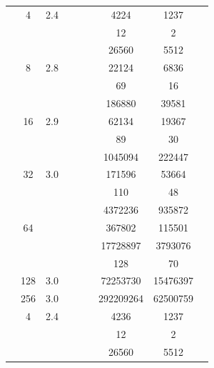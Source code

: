 \begin{table}[htbp]
\begin{tabular}{l S[table-format=3.0] S[table-format=4.1] l S[table-format=6.0] S[table-format=6.0] S[table-format=6.0] S[table-format=5.0] S[table-format=2.0]}
    \midrule
     & 4 & 2.4 &  & {\text{---}} & {\text{---}} & 4224 & 1237 & {\text{---}} \\
     &  &  &  & {\text{---}} & {\text{---}} & 12 & 2 & {\text{---}} \\
     &  &  &  & {\text{---}} & {\text{---}} & 26560 & 5512 & {\text{---}} \\
     & 8 & 2.8 &  & {\text{---}} & {\text{---}} & 22124 & 6836 & {\text{---}} \\
     &  &  &  & {\text{---}} & {\text{---}} & 69 & 16 & {\text{---}} \\
     &  &  &  & {\text{---}} & {\text{---}} & 186880 & 39581 & {\text{---}} \\
     & 16 & 2.9 &  & {\text{---}} & {\text{---}} & 62134 & 19367 & {\text{---}} \\
     &  &  &  & {\text{---}} & {\text{---}} & 89 & 30 & {\text{---}} \\
     &  &  &  & {\text{---}} & {\text{---}} & 1045094 & 222447 & {\text{---}} \\
     & 32 & 3.0 &  & {\text{---}} & {\text{---}} & 171596 & 53664 & {\text{---}} \\
     &  &  &  & {\text{---}} & {\text{---}} & 110 & 48 & {\text{---}} \\
     &  &  &  & {\text{---}} & {\text{---}} & 4372236 & 935872 & {\text{---}} \\
     & 64 & {\text{---}} &  & {\text{---}} & {\text{---}} & 367802 & 115501 & {\text{---}} \\
     &  &  &  & {\text{---}} & {\text{---}} & 17728897 & 3793076 & {\text{---}} \\
     &  &  &  & {\text{---}} & {\text{---}} & 128 & 70 & {\text{---}} \\
     & 128 & 3.0 &  & {\text{---}} & {\text{---}} & 72253730 & 15476397 & {\text{---}} \\
     & 256 & 3.0 &  & {\text{---}} & {\text{---}} & 292209264 & 62500759 & {\text{---}} \\
    \midrule
     & 4 & 2.4 &  & {\text{---}} & {\text{---}} & 4236 & 1237 & {\text{---}} \\
     &  &  &  & {\text{---}} & {\text{---}} & 12 & 2 & {\text{---}} \\
     &  &  &  & {\text{---}} & {\text{---}} & 26560 & 5512 & {\text{---}} \\

\end{tabular}
\end{table}
